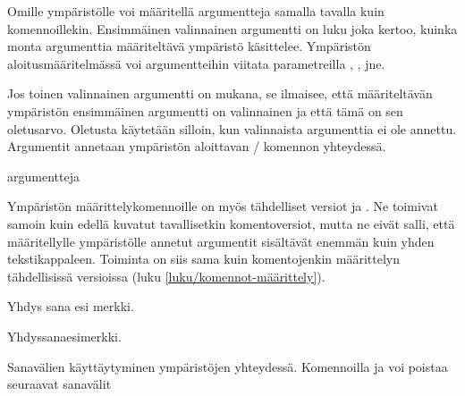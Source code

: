 \begin{koodilohkosis}
\newenvironment{ymp}
{\begin{mahtavuus}
    \omia\hienoja\asetuksia}
  {\end{mahtavuus}}
\end{koodilohkosis}

\noindent
Omille ympäristölle voi määritellä argumentteja samalla tavalla kuin
komennoillekin. Ensimmäinen valinnainen argumentti  on luku
joka kertoo, kuinka monta argumenttia määriteltävä ympäristö käsittelee.
Ympäristön aloitusmääritelmässä voi argumentteihin viitata parametreilla
, ,  jne.

Jos toinen valinnainen argumentti  on mukana, se
ilmaisee, että määriteltävän ympäristön ensimmäinen argumentti on
valinnainen ja että tämä on sen oletusarvo. Oletusta käytetään silloin,
kun valinnaista argumenttia ei ole annettu. Argumentit annetaan
ympäristön aloittavan \-/ komennon yhteydessä.

\begin{koodilohkosis}
\begin{ymp}[valinnainen]{argu}{mentteja}
\end{ymp}
\end{koodilohkosis}

\noindent
Ympäristön määrittelykomennoille on myös tähdelliset versiot
 ja . Ne toimivat
samoin kuin edellä kuvatut tavallisetkin komentoversiot, mutta ne eivät
salli, että määritellylle ympäristölle annetut argumentit sisältävät
enemmän kuin yhden tekstikappaleen. Toiminta on siis sama kuin
komentojenkin määrittelyn tähdellisissä versioissa (luku
\ref{luku/komennot-määrittely}).

\begin{koodilohkosis}
\newenvironment*   {nimi}[n][oletus]{aloitus}{lopetus}
\renewenvironment* {nimi}[n][oletus]{aloitus}{lopetus}
\end{koodilohkosis}

\begin{esimerkki*}

\begin{koodilohko}
\newenvironment{ymp}
{Yhdys\ignorespaces}
{esi\ignorespacesafterend}

\begin{ymp}
  sana%
\end{ymp}   merkki.
\end{koodilohko}
\begin{tulos}
  Yhdyssanaesimerkki.
\end{tulos}
\caption{Sanavälien käyttäytyminen ympäristöjen yhteydessä. Komennoilla
   ja  voi poistaa
  seuraavat sanavälit}
\label{esim/ignorespacesafterend}
\end{esimerkki*}

